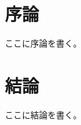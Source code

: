 \documentclass[10pt,a4paper,oneside,twocolumn,fleqn,dvipdfmx]{jsarticle}
\title{\Huge{\@documenttitle}}
\author{\Large{\@authorname}\\\@affiliation}
\date{}
\affiliation{東京大学 堀藤本研究室}
\begin{document}
\begin{abstract}
    ここに概要を書く。
\end{abstract}

\maketitle
\thispagestyle{fancy}

\section{序論}
ここに序論を書く。

\section{結論}
ここに結論を書く。



\end{document}
